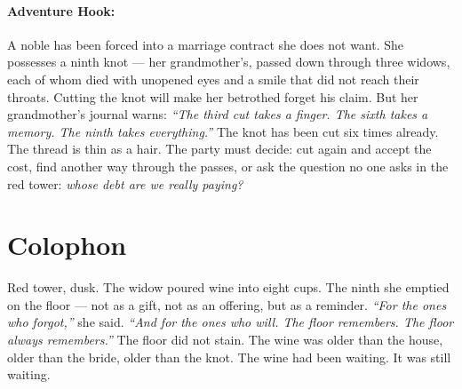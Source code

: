 \paragraph{Adventure Hook:}
A noble has been forced into a marriage contract she does not want. She possesses a ninth knot --- her grandmother's, passed down through three widows, each of whom died with unopened eyes and a smile that did not reach their throats. Cutting the knot will make her betrothed forget his claim. But her grandmother's journal warns: \textit{``The third cut takes a finger. The sixth takes a memory. The ninth takes everything.''} The knot has been cut six times already. The thread is thin as a hair. The party must decide: cut again and accept the cost, find another way through the passes, or ask the question no one asks in the red tower: \textit{whose debt are we really paying?}

\section*{Colophon}
Red tower, dusk. The widow poured wine into eight cups. The ninth she emptied on the floor --- not as a gift, not as an offering, but as a reminder. \textit{``For the ones who forgot,''} she said. \textit{``And for the ones who will. The floor remembers. The floor always remembers.''} The floor did not stain. The wine was older than the house, older than the bride, older than the knot. The wine had been waiting. It was still waiting.